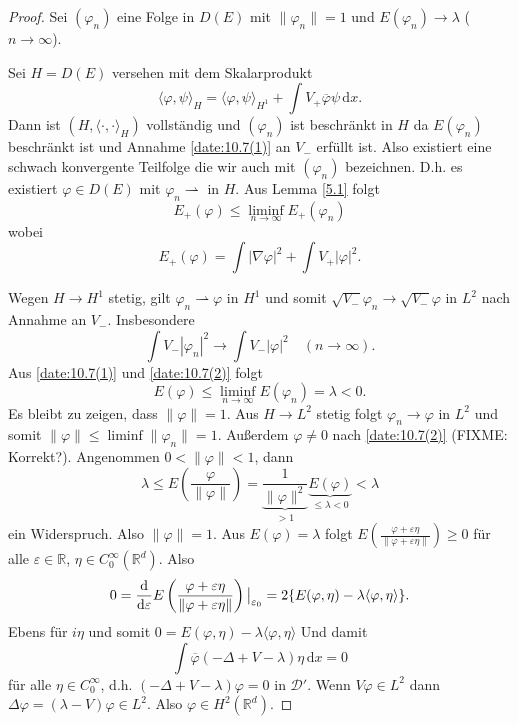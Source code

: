 \documentclass[
paper=a4,
bibtotocnumbered,
liststotocnumbered,
tablecaptionabove,
pointlessnumbers,
twoside,
openright,
10pt
]
{report}
\let\Re\relax\let\Im\relax
\DeclareMathOperator{\Re}{Re}
\DeclareMathOperator{\Im}{Im}
\let\phi\varphi
\theoremstyle{definition}
\numberwithin{equation}{chapter}
\begin{document}
\begin{proof}
Sei $(\phi_n)$ eine Folge in $D(E)$ mit $\| \phi_n\|=1$ und $E(\phi_n) \to \lambda$ ($n\to \infty$).

Sei $H= D(E)$ versehen mit dem Skalarprodukt
\begin{equation}
\langle \phi, \psi\rangle_{H} = \langle \phi, \psi\rangle_{H^1} + \int V_+ \overline{\phi} \psi \, \mathrm dx.
\end{equation}
Dann ist $(H, \langle \cdot, \cdot \rangle_H)$ vollständig und $(\phi_n)$ ist beschränkt in $H$ da $E(\phi_n)$ beschränkt ist und Annahme \eqref{date:10.7(1)} an $V_-$ erfüllt ist. Also existiert eine schwach konvergente Teilfolge die wir auch mit $(\phi_n)$ bezeichnen. D.h. es existiert $\phi \in D(E)$ mit $\phi_n \rightharpoonup$ in $H$. Aus Lemma \ref{5.1} folgt
\begin{equation}
E_+ (\phi) \le \liminf_{n\to \infty} E_+ (\phi_n)
\end{equation}
wobei 
\begin{equation}
E_+(\phi) = \int|\nabla \phi|^2 + \int V_+ |\phi|^2.
\end{equation}

Wegen $H\to H^1$ stetig, gilt $\phi_n \rightharpoonup \phi$ in $H^1$ und somit $\sqrt{V_-} \phi_n \to \sqrt{V_-} \phi$ in $L^2$ nach Annahme an $V_-$. Insbesondere
\begin{equation}\label{date:10.7(2)}
\int V_- |\phi_n|^2\to \int V_- |\phi|^2 \quad (n\to \infty).
\end{equation}
Aus \eqref{date:10.7(1)} und \eqref{date:10.7(2)} folgt
\begin{equation}\label{date:10.7(3)}
E(\phi) \le \liminf_{n\to \infty} E(\phi_n) = \lambda <0.
\end{equation}
Es bleibt zu zeigen, dass $\| \phi\| =1$. Aus $H\to L^2$ stetig folgt $\phi_n \to \phi$ in $L^2$ und somit $\| \phi\| \le \liminf \|\phi_n \|=1$. Außerdem $\phi \neq 0$ nach \eqref{date:10.7(2)} (FIXME: Korrekt?). Angenommen $0 <\|\phi\|<1$, dann
\begin{equation}
\lambda \le E(\frac{\phi}{\|\phi\|} ) = \underbrace{\frac{1}{\|\phi\|^2}}_{>1} \underbrace{E(\phi)}_{\le \lambda <0} <\lambda
\end{equation}
ein Widerspruch. Also $\| \phi\|=1$. Aus $E(\phi) = \lambda$ folgt $E(\frac{\phi+ \varepsilon \eta}{\| \phi + \varepsilon \eta\|})\ge 0$ für alle $\varepsilon \in \mathbb R$, $\eta \in C_0^\infty(\mathbb R^d)$. Also
\begin{equation}
0 = \frac{\mathrm d}{\mathrm d\varepsilon} E\left ( \frac{\phi+ \varepsilon \eta}{\| \phi + \varepsilon \eta\|} \right ) \big |_{\varepsilon_0} = 2\Re\{E(\phi, \eta) - \lambda \langle \phi, \eta\rangle \}.
\end{equation}
Ebens für $i\eta$ und somit $0 = E(\phi, \eta) - \lambda \langle \phi, \eta\rangle$
Und damit 
\begin{equation}
\int \overline{\phi} (-\Delta + V- \lambda) \eta \, \mathrm dx =0
\end{equation}
für alle $\eta \in C_0^\infty$, d.h. $(-\Delta + V- \lambda) \phi=0$ in $\mathcal D'$. Wenn $V\phi \in L^2$ dann $\Delta \phi = (\lambda- V) \phi \in L^2$. Also $\phi \in H^2(\mathbb R^d)$.
\end{proof}
\end{document}
